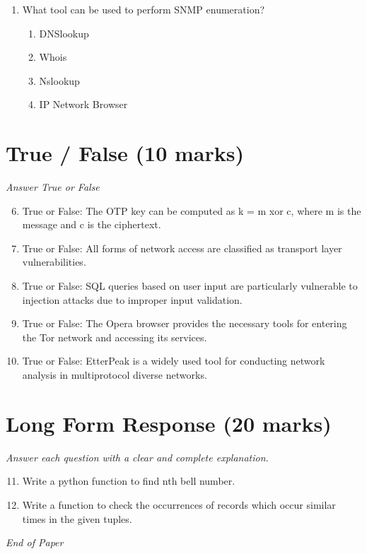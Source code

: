 \documentclass[12pt]{article}
\begin{document}
\begin{enumerate}[label=\arabic*.]
\begin{enumerate}[label=(\alph*)]
    \item No processing power check
    \item No database check
\end{enumerate}
\item What tool can be used to perform SNMP enumeration?
\begin{enumerate}[label=(\alph*)]
    \item DNSlookup
    \item Whois
    \item Nslookup
    \item IP Network Browser
\end{enumerate}
\end{enumerate}

\section*{True / False (10 marks)}
\textit{Answer True or False}
\begin{enumerate}[label=\arabic*.]
\setcounter{enumi}{5}
\item True or False: The OTP key can be computed as k = m xor c, where m is the message and c is the ciphertext.
\item True or False: All forms of network access are classified as transport layer vulnerabilities.
\item True or False: SQL queries based on user input are particularly vulnerable to injection attacks due to improper input validation.
\item True or False: The Opera browser provides the necessary tools for entering the Tor network and accessing its services.
\item True or False: EtterPeak is a widely used tool for conducting network analysis in multiprotocol diverse networks.
\end{enumerate}

\section*{Long Form Response (20 marks)}
\textit{Answer each question with a clear and complete explanation.}
\begin{enumerate}[label=\arabic*.]
\setcounter{enumi}{10}
\item Write a python function to find nth bell number.
\item Write a function to check the occurrences of records which occur similar times in the given tuples.
\end{enumerate}

\vfill
\noindent\textit{End of Paper}
\end{document}
